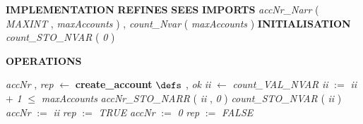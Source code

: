 %
\bsetindent
\begin{tabbing}
\bSetTabs
%
%
\bbnl
{\bf IMPLEMENTATION} \bhsp{} \-\label{BankI}
%
%
\bbnl
{\bf REFINES} \label{Bank}
%
%
\bbnl
{\bf SEES} \label{Bool_TYPE}
%
%
\bbnl
{\bf IMPORTS} \+ \bbnl
{\em accNr\_Narr\/}\label{accNr_Narr}  ( {\em MAXINT\/}\label{MAXINT}  , {\em maxAccounts\/}\label{maxAccounts}  )  , \bnl
{\em count\_Nvar\/}\label{count_Nvar}  ( {\em maxAccounts\/}\label{maxAccounts}  )  \-
%
%
\bbnl
{\bf INITIALISATION} \+ \bbnl
{\em count\_STO\_NVAR\/}\label{count_STO_NVAR}  ( {\em 0\/} )
\end{tabbing}
\bresetindent
%
%
\vspace{-4.5ex}\bsetindent
\begin{tabbing}
\bSetTabs
\+\> \-
%
%
\bnl\bnl
{\bf OPERATIONS} \+ \bbnl

%
%
{\em accNr\/} , {\em rep\/} $\longleftarrow$  {\bf { create\_account}}  \bhsp $\defs$ \+ \bnl
   , {\em ok\/} \- \bhsp {} \+\bnl
{\em ii\/} $\longleftarrow$ {\em count\_VAL\_NVAR\/}\label{count_VAL_NVAR}  \bStatementSemiColon \bnl
{\em ii\/} $:=$  {\em ii\/} $+$ {\em 1\/} \bStatementSemiColon \bnl
{}  $\leq$ {\em maxAccounts\/}\label{maxAccounts}  \- \bhsp {} \+\bnl
{\em accNr\_STO\_NARR\/}\label{accNr_STO_NARR}  ( {\em ii\/} , {\em 0\/} )  \bStatementSemiColon \bnl
{\em count\_STO\_NVAR\/}\label{count_STO_NVAR}  ( {\em ii\/} )  \bStatementSemiColon \bnl
{\em accNr\/} $:=$  {\em ii\/} \bStatementSemiColon \bnl
{\em rep\/} $:=$  {\em TRUE\/} \-\bnl
{} \+\bnl
{\em accNr\/} $:=$  {\em 0\/} \bStatementSemiColon \bnl
{\em rep\/} $:=$  {\em FALSE\/} \-\bnl
{}  \-\bnl
{}  \- \bOperationSemiColon 
\end{tabbing}
